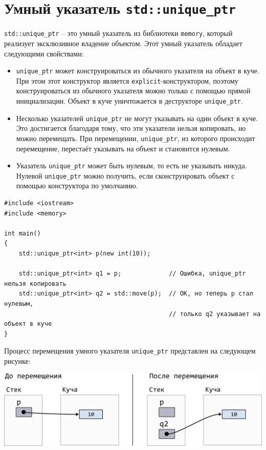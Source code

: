 \documentclass{article}
\begin{document}
\section*{Умный указатель \texttt{std::unique\_ptr}}
\texttt{std::unique\_ptr} -- это умный указатель из библиотеки \texttt{memory}, который реализует эксклюзивное владение объектом. Этот умный указатель обладает следующими свойствами:
\begin{itemize}
\item \texttt{unique\_ptr} может конструироваться из обычного указателя на объект в куче. При этом этот конструктор является \texttt{explicit}-конструктором, поэтому конструироваться из обычного указателя можно только с помощью прямой инициализации. Объект в куче уничтожается в деструкторе \texttt{unique\_ptr}.
\item Несколько указателей \texttt{unique\_ptr} не могут указывать на один объект в куче. Это достигается благодаря тому, что эти указатели нельзя копировать, но можно перемещать. При перемещении, \texttt{unique\_ptr}, из которого происходит перемещение, перестаёт указывать на объект и становится нулевым.
\item Указатель \texttt{unique\_ptr} может быть нулевым, то есть не указывать никуда. Нулевой \texttt{unique\_ptr} можно получить, если сконструировать объект с помощью конструктора по умолчанию.
\end{itemize}

\begin{lstlisting}
#include <iostream>
#include <memory>

int main()
{
	std::unique_ptr<int> p(new int(10));
	
	std::unique_ptr<int> q1 = p;             // Ошибка, unique_ptr нельзя копировать
	std::unique_ptr<int> q2 = std::move(p);  // ОК, но теперь p стал нулевым, 
	                                         // только q2 указывает на объект в куче
}
\end{lstlisting}


Процесс перемещения умного указателя \texttt{unique\_ptr} представлен на следующем рисунке:

\begin{center}
\includegraphics[scale=1]{../images/move_unique_ptr.png}
\end{center}
\end{document}
